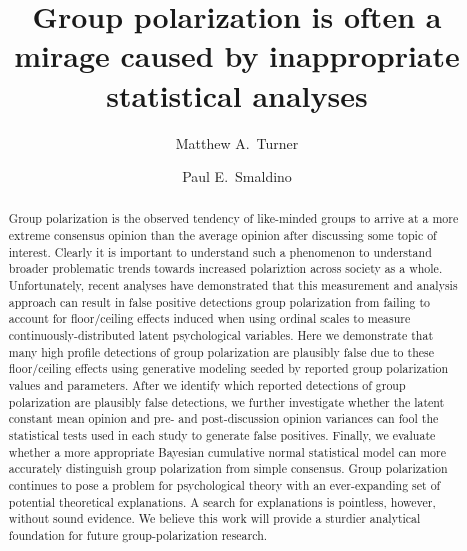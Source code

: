 \documentclass[12pt, letterpaper]{article}
\begin{document}
\title{Group polarization is often a mirage caused by inappropriate statistical analyses}
\author[1,2]{{Matthew A.~Turner}}

\author[3,4,5]{{Paul E.~Smaldino}}



\maketitle


\linenumbers
\modulolinenumbers[5]

\begin{abstract}
  \noindent
  Group polarization is the observed tendency of
  like-minded groups to arrive at a more extreme consensus opinion than
  the average opinion after discussing some topic of interest.
  Clearly it is important to understand such a phenomenon to understand broader
  problematic trends towards increased polariztion across society as a whole.
  Unfortunately, recent analyses have demonstrated that this measurement and
  analysis approach can result in false positive detections group polarization
  from failing to account for floor/ceiling effects induced when using ordinal scales to
  measure continuously-distributed latent psychological variables. 
  Here we demonstrate that many high profile detections
  of group polarization are plausibly false
  due to these floor/ceiling effects using generative modeling seeded by 
  reported group polarization values and parameters. After we identify which
  reported detections of group polarization are plausibly false detections, we further
  investigate whether the latent constant mean opinion and pre- and post-discussion
  opinion variances can fool the statistical tests used in each study to 
  generate false positives. Finally, we evaluate whether a more appropriate
  Bayesian cumulative normal statistical model can more accurately distinguish
  group polarization from simple consensus. Group polarization continues to 
  pose a problem for psychological theory with an ever-expanding set of potential theoretical
  explanations. A search for explanations is pointless, however, without sound
  evidence. We believe this work will provide a sturdier analytical foundation for 
  future group-polarization research.
\end{abstract}
\end{document}
